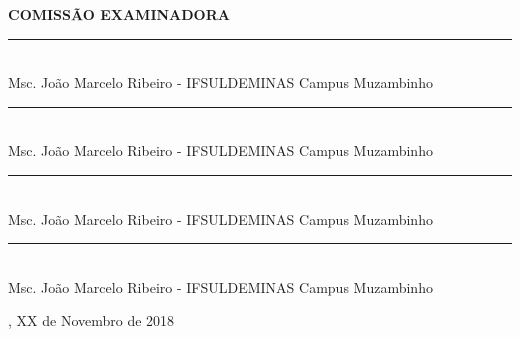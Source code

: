 %
%

\makeatletter
\begin{folhadeaprovacao}

\thispagestyle{empty}%

	\vspace*{\fill}%
	    \large%
		\hfill%
    	\begin{minipage}{10 cm}%
  			\begin{center}%
	    	\vspace*{1.21 cm}%
			\textbf{COMISSÃO EXAMINADORA}\\ %
					
			\vspace*{1 cm}%
			\rule{10 cm}{.1 mm}\\
			{Msc. João Marcelo Ribeiro - IFSULDEMINAS Campus Muzambinho}
			
			\vspace*{1 cm}%
			\rule{10 cm}{.1 mm}\\
			{Msc. João Marcelo Ribeiro - IFSULDEMINAS Campus Muzambinho}

			\vspace*{1 cm}%
			\rule{10 cm}{.1 mm}\\
			{Msc. João Marcelo Ribeiro - IFSULDEMINAS Campus Muzambinho}

			\vspace*{1 cm}%
			\rule{10 cm}{.1 mm}\\
			{Msc. João Marcelo Ribeiro - IFSULDEMINAS Campus Muzambinho}
							
		    \end{center}%
	    \end{minipage}%
		    	
	    \vspace*{2 cm}%
	    \begin{flushright}
            {\imprimirlocal}, XX de Novembro de 2018
        \end{flushright}

\end{folhadeaprovacao}
\makeatother
